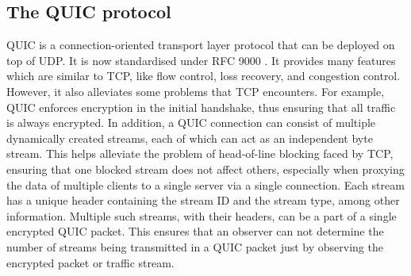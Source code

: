 \subsection{The QUIC protocol}
\label{subsec:netshaper-background-quic}

QUIC is a connection-oriented transport layer protocol that can be deployed on top of UDP.
It is now standardised under RFC 9000 \cite{quic_rfc}.
It provides many features which are similar to TCP, like flow control, loss recovery, and congestion control. 
However, it also alleviates some problems that TCP encounters.
For example, QUIC enforces encryption in the initial handshake, thus ensuring that all traffic is always encrypted.
In addition, a QUIC connection can consist of multiple dynamically created streams, each of which can act as an independent byte stream. 
This helps alleviate the problem of head-of-line blocking faced by TCP, ensuring that one blocked stream does not affect others, especially when proxying the data of multiple clients to a single server via a single connection.
Each stream has a unique header containing the stream ID and the stream type, among other information.
Multiple such streams, with their headers, can be a part of a single encrypted QUIC packet.
This ensures that an observer can not determine the number of streams being transmitted in a QUIC packet just by observing the encrypted packet or traffic stream.


\endinput

\footnote{While QUIC has a PADDING frame, we don't use it, as a packet that only contains padding frames will not be re-transmitted in case of packet loss, thus revealing that it was a dummy packet.}

